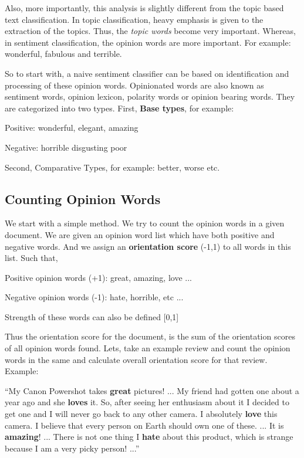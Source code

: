 Also, more importantly,  this analysis is slightly different from the topic based text classification. In topic classification, heavy emphasis is given to the extraction of the topics. Thus, the \textit{topic words} become very important.  Whereas, in sentiment classification, the opinion words are more important. For example: wonderful, fabulous and terrible. 

So to start with, a naive sentiment classifier can be based on identification and processing of these opinion words. Opinionated words are also known as sentiment words, opinion lexicon, polarity words or opinion bearing words. They are categorized into two types. First, \textbf{Base types}, for example:

Positive: wonderful, elegant, amazing

Negative: horrible disgusting poor

Second, Comparative Types, for example: better, worse etc.

\subsection{Counting Opinion Words}

We start with a simple method. We try to count the opinion words in a given document. We are given an opinion word list which have both positive and negative words. And we assign an \textbf{orientation score} (-1,1) to all words in this list. Such that, \newline

Positive opinion words (+1): great, amazing, love ...

Negative opinion words (-1): hate, horrible, etc ...

Strength of these words can also be defined [0,1] 
\newline

Thus the orientation score for the document, is the sum of the orientation scores of all opinion words found. Lets, take an example review and count the opinion words in the same and calculate overall orientation score for that review. Example:

“My Canon Powershot takes \textbf{great} pictures! ... My friend had gotten one about a year ago and she \textbf{loves} it. So, after seeing her enthusiasm about it I decided to get one and I will never go back to any other camera. I absolutely \textbf{love} this camera. I believe that every person on Earth should own one of these. ... It is \textbf{amazing}! ... There is not one thing I \textbf{hate} about this product, which is strange because I am a very picky person! ...”

